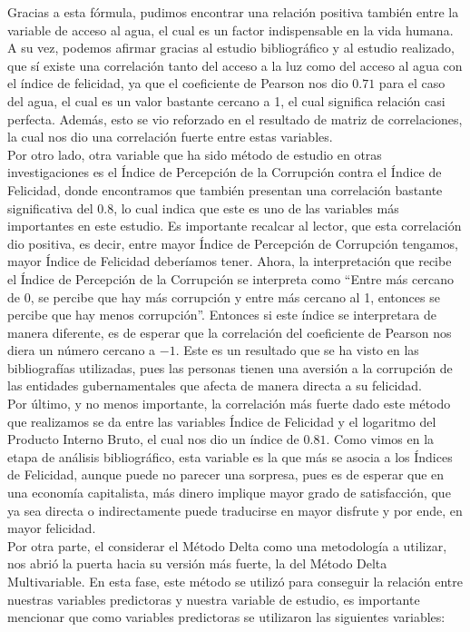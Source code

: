 Gracias a esta fórmula, pudimos encontrar una relación positiva también entre la variable de acceso al agua, el cual es un factor indispensable en la vida humana. A su vez, podemos afirmar gracias al estudio bibliográfico y al estudio realizado, que sí existe una correlación tanto del acceso a la luz como del acceso al agua con el índice de felicidad, ya que el coeficiente de Pearson nos dio $0.71$ para el caso del agua, el cual es un valor bastante cercano a 1, el cual significa relación casi perfecta. Además, esto se vio reforzado en el resultado de matriz de correlaciones, la cual nos dio una correlación fuerte entre estas variables. \\

Por otro lado, otra variable que ha sido método de estudio en otras investigaciones es el Índice de Percepción de la Corrupción contra el Índice de Felicidad, donde encontramos que también presentan una correlación bastante significativa del 0.8, lo cual indica que este es uno de las variables más importantes en este estudio. Es importante recalcar al lector, que esta correlación dio positiva, es decir, entre mayor Índice de Percepción de Corrupción tengamos, mayor Índice de Felicidad deberíamos tener. Ahora, la interpretación que recibe el Índice de Percepción de la Corrupción se interpreta como ``Entre más cercano de 0, se percibe que hay más corrupción y entre más cercano al 1, entonces se percibe que hay menos corrupción''. Entonces si este índice se interpretara de manera diferente, es de esperar que la correlación del coeficiente de Pearson nos diera un número cercano a $-1$. Este es un resultado que se ha visto en las bibliografías utilizadas, pues las personas tienen una aversión a la corrupción de las entidades gubernamentales que afecta de manera directa a su felicidad. \\

Por último, y no menos importante, la correlación más fuerte dado este método que realizamos se da entre las variables Índice de Felicidad y el logaritmo del Producto Interno Bruto, el cual nos dio un índice de $0.81$. Como vimos en la etapa de análisis bibliográfico, esta variable es la que más se asocia a los Índices de Felicidad, aunque puede no parecer una sorpresa, pues es de esperar que en una economía capitalista, más dinero implique mayor grado de satisfacción, que ya sea directa o indirectamente puede traducirse en mayor disfrute y por ende, en mayor felicidad. \\ 

Por otra parte, el considerar el Método Delta como una metodología a utilizar, nos abrió la puerta hacia su versión más fuerte, la del Método Delta Multivariable. En esta fase, este método se utilizó para conseguir la relación entre nuestras variables predictoras y nuestra variable de estudio, es importante mencionar que como variables predictoras se utilizaron las siguientes variables:

